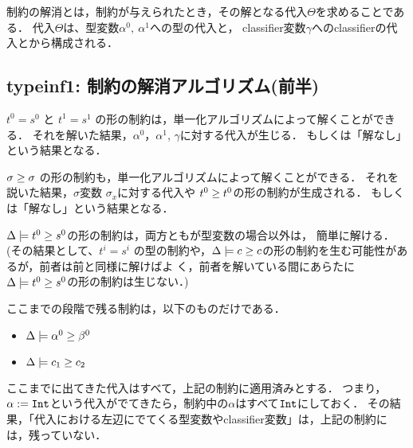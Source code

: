 制約の解消とは，制約が与えられたとき，その解となる代入$\Theta$を求めることである．
代入$\Theta$は、型変数$\alpha^0,~ \alpha^1$への型の代入と，
classifier変数$\gamma$へのclassifierの代入とから構成される．



\subsection{typeinf1: 制約の解消アルゴリズム(前半)}
$t^0=s^0$ と $t^1=s^1$ の形の制約は，単一化アルゴリズムによって解くことができる．
それを解いた結果，$\alpha^0$，$\alpha^1$, $\gamma$に対する代入が生じる．
もしくは「解なし」という結果となる．

${\sigma} \ge {\sigma}$ の形の制約も，単一化アルゴリズムによって解くことができる．
それを説いた結果，$\sigma$変数 $\sigma_x$に対する代入や ${t^0} \ge {t^0}$の形の制約が生成される．
もしくは「解なし」という結果となる．

$\Delta \models {t^0} \ge {s^0}$の形の制約は，両方ともが型変数の場合以外は，
簡単に解ける．(その結果として、$t^i=s^i$ の型の制約や，$\Delta \models
{c} \ge {c}$の形の制約を生む可能性があるが，前者は前と同様に解けばよ
く，前者を解いている間にあらたに$\Delta \models {t^0} \ge {s^0}$の形の制約は生じない．)

ここまでの段階で残る制約は，以下のものだけである．

\begin{itemize}
\item $\Delta \models {\alpha^0} \ge {\beta^0}$
\item $\Delta \models {c_1} \ge {c_2}$
\end{itemize}

ここまでに出てきた代入はすべて，上記の制約に適用済みとする．
つまり，$\alpha:=\mbox{\texttt{Int}}$という代入がでてきたら，制約中の$\alpha$はすべて$\mbox{\texttt{Int}}$にしておく．
その結果，「代入における左辺にでてくる型変数やclassifier変数」は，上記の制約には，残っていない．

